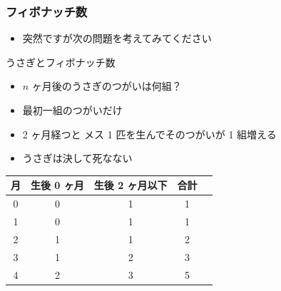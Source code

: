 \begin{frame}[fragile]
\frametitle{フィボナッチ数}
  \begin{itemize}
\item 突然ですが次の問題を考えてみてください
  \end{itemize}
  \begin{block}{うさぎとフィボナッチ数}
    \begin{itemize}
\item $n$ ヶ月後のうさぎのつがいは何組？
\item 最初一組のつがいだけ
\item 2 ヶ月経つと メス 1 匹を生んでそのつがいが 1 組増える
\item うさぎは決して死なない
    \end{itemize}
  \end{block}
  \begin{center}
    \begin{tabular}{ccccc}
月&生後 0 ヶ月&生後 2 ヶ月以下&合計\\
\hline
0&0&1&1\\
1&0&1&1\\
2&1&1&2\\
3&1&2&3\\
4&2&3&5\\
    \end{tabular}
  \end{center}
\end{frame}
